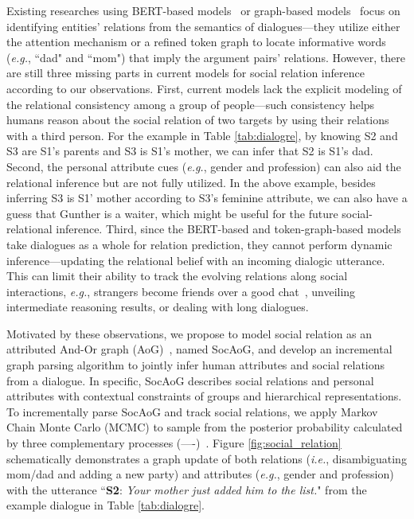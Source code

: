 \documentclass[11pt,a4paper]{article}
\begin{document}
Existing researches using BERT-based models~\citep{devlin2018bert, yu-etal-2020-dialogue, xue2020embarrassingly} or graph-based models~\citep{xue2020gdpnet, chen2020dialogue} focus on identifying entities' relations from the semantics of dialogues---they utilize either the attention mechanism or a refined token graph to locate informative words (\textit{e.g.}, ``dad" and ``mom") that imply the argument pairs' relations. However, there are still three missing parts in current models for social relation inference according to our observations. First, current models lack the explicit modeling of the relational consistency among a group of people---such consistency helps humans reason about the social relation of two targets by using their relations with a third person. For the example in Table \ref{tab:dialogre}, by knowing S2 and S3 are S1's parents and S3 is S1's mother, we can infer that S2 is S1's dad. Second, the personal attribute cues (\textit{e.g.}, gender and profession) can also aid the relational inference but are not fully utilized. In the above example, besides inferring S3 is S1' mother according to S3's feminine attribute, we can also have a guess that Gunther is a waiter, which might be useful for the future social-relational inference. Third, since the BERT-based and token-graph-based models take dialogues as a whole for relation prediction, they cannot perform dynamic inference---updating the relational belief with an incoming dialogic utterance. This can limit their ability to track the evolving relations along social interactions, \textit{e.g.}, strangers become friends over a good chat~\citep{kukleva2020learning}, unveiling intermediate reasoning results, or dealing with long dialogues. 

Motivated by these observations, we propose to model social relation as an attributed And-Or graph (AoG)~\citep{zhu1998filters, zhu2007stochastic, wu2011numerical, shu2016learning, qi2018human}, named SocAoG, and develop an incremental graph parsing algorithm to jointly infer human attributes and social relations from a dialogue. In specific, SocAoG describes social relations and personal attributes with contextual constraints of groups and hierarchical representations. To incrementally parse SocAoG and track social relations, we apply Markov Chain Monte Carlo (MCMC) to sample from the posterior probability calculated by three complementary processes (----)~\citep{qu2020few, zayaraz2015concept}. Figure \ref{fig:social_relation} schematically demonstrates a graph update of both relations (\textit{i.e.}, disambiguating mom/dad and adding a new party) and attributes (\textit{e.g.}, gender and profession) with the utterance ``\textbf{S2}: \textit{Your mother just added him to the list.}" from the example dialogue in Table \ref{tab:dialogre}. 
\end{document}
